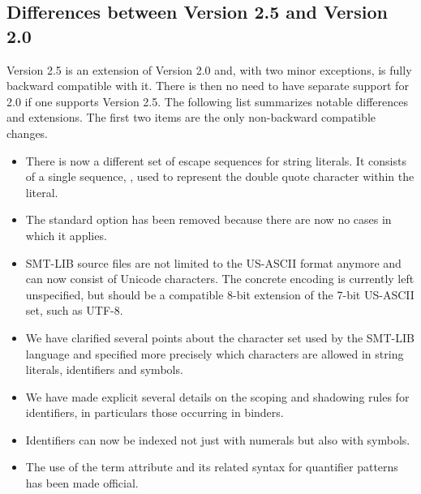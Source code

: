 \subsection{Differences between Version 2.5 and Version 2.0}

Version 2.5 is an extension of Version 2.0 and, with two minor exceptions,
is fully backward compatible with it.
There is then no need to have separate support for 2.0 
if one supports Version 2.5.
The following list summarizes notable differences and extensions.
The first two items are the only non-backward compatible changes.


\begin{itemize}
\item
There is now a different set of escape sequences for string literals.
It consists of a single sequence, , used to represent the double quote
character within the literal.

\item
The standard option  has been removed
because there are now no cases in which it applies. 

\item
SMT-LIB source files are not limited to the US-ASCII format anymore
and can now consist of Unicode characters.  
The concrete encoding is currently left unspecified, but should be 
a compatible 8-bit extension of the 7-bit US-ASCII set, such as UTF-8.

\item
We have clarified several points about the character set used 
by the SMT-LIB language and specified more precisely which characters are allowed
in string literals, identifiers and symbols.

\item
We have made explicit several details on the scoping and shadowing rules
for identifiers, in particulars those occurring in binders.

\item
Identifiers can now be indexed not just with numerals but also with symbols.

\item
The use of the term attribute  and its related syntax 
for quantifier patterns has been made official.

 

\end{itemize}
